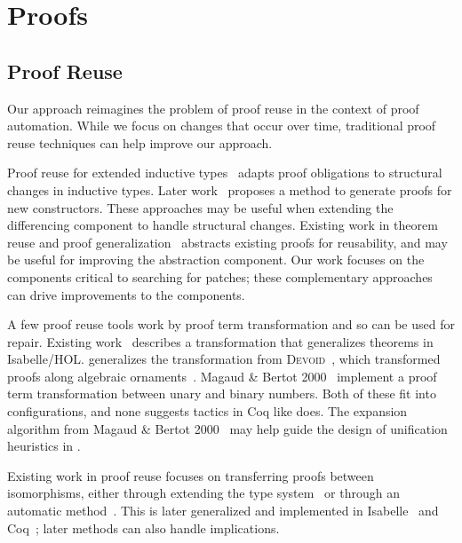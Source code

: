 \section{Proofs}

\subsection*{Proof Reuse}


Our approach reimagines the problem of proof reuse in the context of proof automation.
While we focus on changes that occur over time, traditional proof reuse techniques can help
improve our approach.

Proof reuse for extended inductive types~\cite{Boite2004} adapts proof obligations
to structural changes in inductive types. Later work~\cite{Mulhern06proofweaving} proposes a method
to generate proofs for new constructors. These approaches may be useful when extending the differencing
component to handle structural changes. Existing work in theorem reuse and proof generalization~\cite{Felty1994, pons00, Johnsen2004} abstracts existing proofs for reusability, and may be useful
for improving the abstraction component. %
Our work focuses on the components critical to searching for patches; these complementary approaches
can drive improvements to the components.


A few proof reuse tools work by proof term transformation and so can be used for repair.
Existing work~\cite{Johnsen2004} describes a transformation that generalizes theorems in Isabelle/HOL.
\toolnamec generalizes the transformation from \textsc{Devoid}~\cite{Ringer2019},
which transformed proofs along algebraic ornaments~\cite{mcbride}.
Magaud \& Bertot 2000~\cite{magaud2000changing} implement a proof term transformation between
unary and binary numbers. 
Both of these fit into \toolnamec configurations,
and none suggests tactics in Coq like \toolnamec does.
The expansion algorithm from Magaud \& Bertot 2000~\cite{magaud2000changing} may help guide the design
of unification heuristics in \toolnamec.


Existing work in proof reuse focuses on transferring proofs between isomorphisms,
either through extending the type system~\cite{Barthe:2001:TIP:646793.704711} or through an automatic method~\cite{Magaud2002}.
This is later generalized and implemented in Isabelle~\cite{Huffman2013} and Coq~\cite{ZimmermannH15, tabareau:hal-01559073};
later methods can also handle implications.

